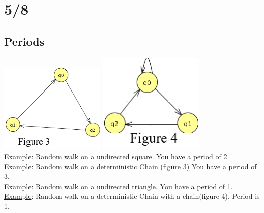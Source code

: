\section*{5/8}
  \subsection*{Periods}
    \includegraphics[width=50mm]{5_8_f3.png}
    \includegraphics[width=50mm]{5_8_f4.png}\\
    \underline{Example}: Random walk on a undirected square. You have a period of 2.\\
    \underline{Example}: Random walk on a deterministic Chain (figure 3)
      You have a period of 3.\\
    \underline{Example}: Random walk on a undirected triangle. You have a period of 1.\\
    \underline{Example}: Random walk on a deterministic Chain with a chain(figure 4).
      Period is 1.\\
   
